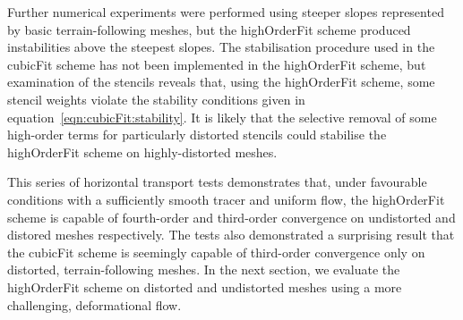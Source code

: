 Further numerical experiments were performed using steeper slopes represented by basic terrain-following meshes, but the highOrderFit scheme produced instabilities above the steepest slopes.
The stabilisation procedure used in the cubicFit scheme has not been implemented in the highOrderFit scheme, but examination of the stencils reveals that, using the highOrderFit scheme, some stencil weights violate the stability conditions given in equation~\eqref{eqn:cubicFit:stability}.
It is likely that the selective removal of some high-order terms for particularly distorted stencils could stabilise the highOrderFit scheme on highly-distorted meshes.

This series of horizontal transport tests demonstrates that, under favourable conditions with a sufficiently smooth tracer and uniform flow, the highOrderFit scheme is capable of fourth-order and third-order convergence on undistorted and distored meshes respectively.
The tests also demonstrated a surprising result that the cubicFit scheme is seemingly capable of third-order convergence only on distorted, terrain-following meshes.
In the next section, we evaluate the highOrderFit scheme on distorted and undistorted meshes using a more challenging, deformational flow.
